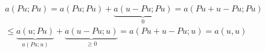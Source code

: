 \begin{solution}
\begin{enumerate}[label = \textbf{\alph*)}]
\begin{itemize}
    \begin{multline*}
      a(Pu; Pu)
      =
      a(Pu; Pu)
      +
      \underbrace{a(u - Pu; Pu)}_0
      =
      a(Pu + u - Pu; Pu) \\
      \leq
      \underbrace{a(u; Pu)}_{a(Pu; u)}
      +
      \underbrace{a(u - Pu; u)}_{\geq 0}
      =
      a(Pu + u - Pu; u)
      =
      a(u, u)
    \end{multline*}

  \end{itemize}

\end{enumerate}

\end{solution}

